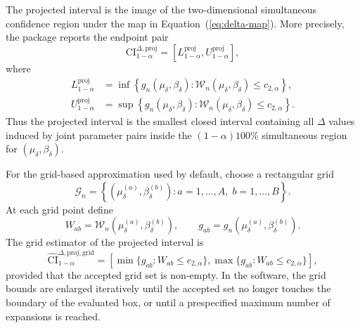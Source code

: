 \documentclass[11pt]{article}
\begin{document}
The projected interval is the image of the two-dimensional simultaneous confidence region under the map in Equation~(\ref{eq:delta-map}). More precisely, the package reports the endpoint pair
\[
  \mathrm{CI}^{\Delta,\mathrm{proj}}_{1-\alpha}
  =
  \left[
    L^{\mathrm{proj}}_{1-\alpha},
    U^{\mathrm{proj}}_{1-\alpha}
  \right],
\]
where
\begin{align}
  L^{\mathrm{proj}}_{1-\alpha}
  &=
  \inf
  \left\{
    g_n(\mu_\delta,\beta_\delta)
    :
    \mathcal{W}_n(\mu_\delta,\beta_\delta) \leq c_{2,\alpha}
  \right\},\label{eq:delta-proj-lower}\\
  U^{\mathrm{proj}}_{1-\alpha}
  &=
  \sup
  \left\{
    g_n(\mu_\delta,\beta_\delta)
    :
    \mathcal{W}_n(\mu_\delta,\beta_\delta) \leq c_{2,\alpha}
  \right\}.\label{eq:delta-proj-upper}
\end{align}
Thus the projected interval is the smallest closed interval containing all $\Delta$ values induced by joint parameter pairs inside the $(1-\alpha)100\%$ simultaneous region for $(\mu_\delta,\beta_\delta)$.

For the grid-based approximation used by default, choose a rectangular grid
\[
  \mathcal{G}_n
  =
  \left\{
    (\mu_\delta^{(a)},\beta_\delta^{(b)})
    :
    a = 1,\ldots,A,\;
    b = 1,\ldots,B
  \right\}.
\]
At each grid point define
\[
  W_{ab} = \mathcal{W}_n(\mu_\delta^{(a)},\beta_\delta^{(b)}),
  \qquad
  g_{ab} = g_n(\mu_\delta^{(a)},\beta_\delta^{(b)}).
\]
The grid estimator of the projected interval is
\[
  \widehat{\mathrm{CI}}^{\Delta,\mathrm{proj,grid}}_{1-\alpha}
  =
  \left[
    \min\{g_{ab} : W_{ab} \leq c_{2,\alpha}\},
    \max\{g_{ab} : W_{ab} \leq c_{2,\alpha}\}
  \right],
\]
provided that the accepted grid set is non-empty. In the software, the grid bounds are enlarged iteratively until the accepted set no longer touches the boundary of the evaluated box, or until a prespecified maximum number of expansions is reached.
\end{document}

